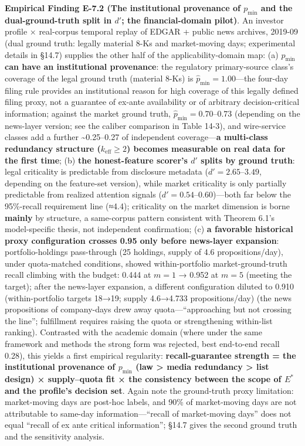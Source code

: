 \documentclass[
  11pt]{article}
\begin{document}
\textbf{Empirical Finding E-7.2 (The institutional provenance of
\(p_{\min}\) and the dual-ground-truth split in \(d'\); the
financial-domain pilot)}. An investor profile × real-corpus temporal
replay of EDGAR + public news archives, 2019-09 (dual ground truth:
legally material 8-Ks and market-moving days; experimental details in
§14.7) supplies the other half of the applicability-domain map: (a)
\textbf{\(p_{\min}\) can have an institutional provenance}: the
regulatory primary-source class's coverage of the legal ground truth
(material 8-Ks) is \(\hat p_{\min} = 1.00\)---the four-day filing rule
provides an institutional reason for high coverage of this legally
defined filing proxy, not a guarantee of ex-ante availability or of
arbitrary decision-critical information; against the market ground
truth, \(\hat p_{\min}=0.70\)--\(0.73\) (depending on the news-layer
version; see the caliber comparison in Table 14-3), and wire-service
classes add a further \textasciitilde0.25--0.27 of independent
coverage---\textbf{a multi-class redundancy structure
(\(k_{\mathrm{eff}}\ge2\)) becomes measurable on real data for the first
time}; (b) \textbf{the honest-feature scorer's \(d'\) splits by ground
truth}: legal criticality is predictable from disclosure metadata
(\(d'=2.65\)--\(3.49\), depending on the feature-set version), while
market criticality is only partially predictable from realized attention
signals (\(d'=0.54\)--\(0.60\))---both far below the 95\%-recall
requirement line (≈4.4); criticality on the market dimension is borne
\textbf{mainly} by structure, a same-corpus pattern consistent with
Theorem 6.1's model-specific thesis, not independent confirmation; (c)
\textbf{a favorable historical proxy configuration crosses 0.95 only
before news-layer expansion}: portfolio-holdings pass-through (25
holdings, supply of 4.6 propositions/day), under quota-matched
conditions, showed within-portfolio market-ground-truth recall climbing
with the budget: 0.444 at \(m=1\) → 0.952 at \(m=5\) (meeting the
target); after the news-layer expansion, a different configuration
diluted to 0.910 (within-portfolio targets 18→19; supply 4.6→4.733
propositions/day) (the news propositions of company-days drew away
quota---``approaching but not crossing the line''; fulfillment requires
raising the quota or strengthening within-list ranking). Contrasted with
the academic domain (where under the same framework and methods the
strong form was rejected, best end-to-end recall 0.28), this yields a
first empirical regularity: \textbf{recall-guarantee strength = the
institutional provenance of \(p_{\min}\) (law \textgreater{} media
redundancy \textgreater{} list design) × supply--quota fit × the
consistency between the scope of \(E^*\) and the profile's decision
set}. Again note the ground-truth proxy limitation: market-moving days
are post-hoc labels, and 90\% of market-moving days are not attributable
to same-day information---``recall of market-moving days'' does not
equal ``recall of ex ante critical information''; §14.7 gives the second
ground truth and the sensitivity analysis.
\end{document}
